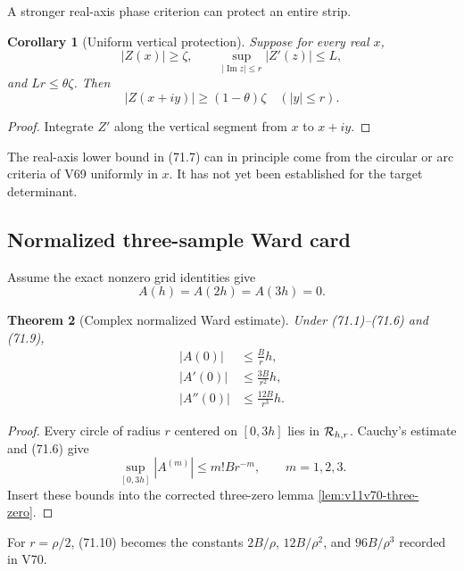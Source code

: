 \documentclass[11pt]{article}
\newtheorem{theorem}{Theorem}[section]
\newtheorem{corollary}[theorem]{Corollary}
\begin{document}
A stronger real-axis phase criterion can protect an entire strip.

\begin{corollary}[Uniform vertical protection]
\label{cor:v11v71-vertical}
Suppose for every real \(x\),
\[
                         |Z(x)|\ge\zeta,\qquad
                         \sup_{|\operatorname{Im}z|\le r}|Z'(z)|
                                  \le L,                      \tag{71.7}
\]
and \(Lr\le\theta\zeta\).  Then
\[
                         |Z(x+iy)|\ge(1-\theta)\zeta
                              \quad(|y|\le r).                 \tag{71.8}
\]
\end{corollary}

\begin{proof}
Integrate \(Z'\) along the vertical segment from \(x\) to \(x+iy\).
\end{proof}

The real-axis lower bound in (71.7) can in principle come from the
circular or arc criteria of V69 uniformly in \(x\).  It has not yet
been established for the target determinant.

\subsection{Normalized three-sample Ward card}

Assume the exact nonzero grid identities give
\[
                              A(h)=A(2h)=A(3h)=0.              \tag{71.9}
\]

\begin{theorem}[Complex normalized Ward estimate]
\label{thm:v11v71-ward}
Under (71.1)--(71.6) and (71.9),
\[
\begin{split}
 |A(0)|&\le \frac{B}{r}h,\\
 |A'(0)|&\le \frac{3B}{r^2}h,\\
 |A''(0)|&\le \frac{12B}{r^3}h.                              \tag{71.10}
\end{split}
\]
\end{theorem}

\begin{proof}
Every circle of radius \(r\) centered on \([0,3h]\) lies in
\({\cal R}_{h,r}\).  Cauchy's estimate and (71.6) give
\[
                         \sup_{[0,3h]}|A^{(m)}|
                              \le m!B r^{-m},\qquad m=1,2,3.  \tag{71.11}
\]
Insert these bounds into the corrected three-zero lemma
\ref{lem:v11v70-three-zero}.
\end{proof}

For \(r=\rho/2\), (71.10) becomes the constants
\(2B/\rho\), \(12B/\rho^2\), and \(96B/\rho^3\) recorded in V70.
\end{document}
